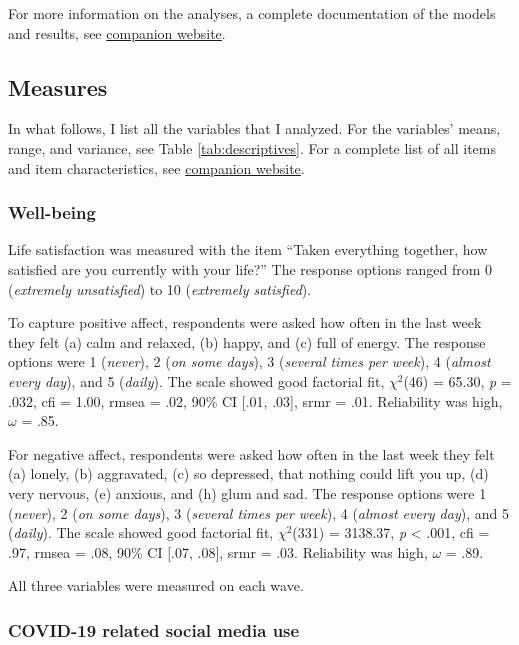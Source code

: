 \documentclass[
  english,
  man,floatsintext]{apa6}
\begin{document}
For more information on the analyses, a complete documentation of the models and results, see \href{https://tdienlin.github.io/Austrian_Corona_Panel/index.html}{companion website}.

\hypertarget{measures}{%
\subsection{Measures}\label{measures}}

In what follows, I list all the variables that I analyzed.
For the variables' means, range, and variance, see Table \ref{tab:descriptives}.
For a complete list of all items and item characteristics, see \href{https://tdienlin.github.io/Austrian_Corona_Panel/index.html}{companion website}.

\hypertarget{well-being}{%
\subsubsection{Well-being}\label{well-being}}

Life satisfaction was measured with the item ``Taken everything together, how satisfied are you currently with your life?''
The response options ranged from 0 (\emph{extremely unsatisfied}) to 10 (\emph{extremely satisfied}).

To capture positive affect, respondents were asked how often in the last week they felt (a) calm and relaxed, (b) happy, and (c) full of energy.
The response options were 1 (\emph{never}), 2 (\emph{on some days}), 3 (\emph{several times per week}), 4 (\emph{almost every day}), and 5 (\emph{daily}).
The scale showed good factorial fit, \(\chi^2\)(46) = 65.30, \textit{p} = .032, cfi = 1.00, rmsea = .02, 90\% CI {[}.01, .03{]}, srmr = .01.
Reliability was high, \(\omega\) = .85.

For negative affect, respondents were asked how often in the last week they felt (a) lonely, (b) aggravated, (c) so depressed, that nothing could lift you up, (d) very nervous, (e) anxious, and (h) glum and sad.
The response options were 1 (\emph{never}), 2 (\emph{on some days}), 3 (\emph{several times per week}), 4 (\emph{almost every day}), and 5 (\emph{daily}).
The scale showed good factorial fit, \(\chi^2\)(331) = 3138.37, \textit{p} \textless{} .001, cfi = .97, rmsea = .08, 90\% CI {[}.07, .08{]}, srmr = .03.
Reliability was high, \(\omega\) = .89.

All three variables were measured on each wave.

\hypertarget{covid-19-related-social-media-use}{%
\subsubsection{COVID-19 related social media use}\label{covid-19-related-social-media-use}}
\end{document}
